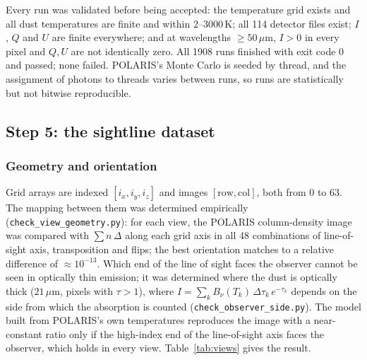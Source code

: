 Every run was validated before being accepted: the temperature grid exists and all dust temperatures are finite
and within $2$--$3000\,\mathrm{K}$; all 114 detector files exist; $I$, $Q$ and $U$ are finite everywhere; and at
wavelengths $\geq50\,\mu\mathrm{m}$, $I>0$ in every pixel and $Q,U$ are not identically zero. All 1908 runs
finished with exit code 0 and passed; none failed. POLARIS's Monte Carlo is seeded by thread, and the assignment
of photons to threads varies between runs, so runs are statistically but not bitwise reproducible.

\subsection{Step 5: the sightline dataset}
\label{sec:dataset:table}

\subsubsection{Geometry and orientation}
\label{sec:dataset:geometry}

Grid arrays are indexed $[i_x,i_y,i_z]$ and images $[\mathrm{row},\mathrm{col}]$, both from 0 to 63. The mapping
between them was determined empirically (\texttt{check\_view\_geometry.py}): for each view, the POLARIS
column-density image was compared with $\sum n\,\Delta$ along each grid axis in all 48 combinations of
line-of-sight axis, transposition and flips; the best orientation matches to a relative difference of
$\approx10^{-13}$. Which end of the line of sight faces the observer cannot be seen in optically thin emission; it
was determined where the dust is optically thick ($21\,\mu\mathrm{m}$, pixels with $\tau>1$), where
$I=\sum_k B_\nu(T_k)\,\Delta\tau_k\,e^{-\tau_k}$ depends on the side from which the absorption is counted
(\texttt{check\_observer\_side.py}). The model built from POLARIS's own temperatures reproduces the image with a
near-constant ratio only if the high-index end of the line-of-sight axis faces the observer, which holds in every
view. Table~\ref{tab:views} gives the result.

